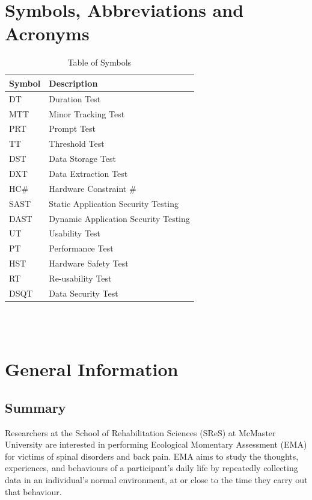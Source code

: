 \documentclass[12pt, titlepage]{article}
\begin{document}
\listoftables
\newpage

\section{Symbols, Abbreviations and Acronyms}
\renewcommand{\arraystretch}{1.2}

\begin{table}[H]
	\begin{tabular}{l l} 
		  \toprule		
			  \textbf{Symbol} & \textbf{Description}\\
			  \midrule 
			  DT 						& Duration Test\\
			  MTT 					& Minor Tracking Test\\
			  PRT 					& Prompt Test\\
			  TT 						& Threshold Test\\
			  DST 					& Data Storage Test\\
			  DXT 					& Data Extraction Test\\
			  HC\#					& Hardware Constraint \#\\ 
			  SAST					& Static Application Security Testing\\			
			  DAST					& Dynamic Application Security Testing\\
			  UT						& Usability Test\\
			  PT						& Performance Test\\
			  HST					& Hardware Safety Test\\
			  RT						& Re-usability Test\\
			  DSQT					& Data Security Test\\
		  \bottomrule
	\end{tabular}\\\\
\caption{\label{Syb}Table of Symbols}
\end{table}

\newpage


\section{General Information}

\subsection{Summary}

Researchers at the School of Rehabilitation Sciences (SReS) at McMaster University are interested in performing Ecological Momentary Assessment (EMA) for victims of spinal disorders and back pain. EMA aims to study the thoughts, experiences, and behaviours of a participant's daily life by repeatedly collecting data in an individual's normal environment, at or close to the time they carry out that behaviour.\\
\end{document}
